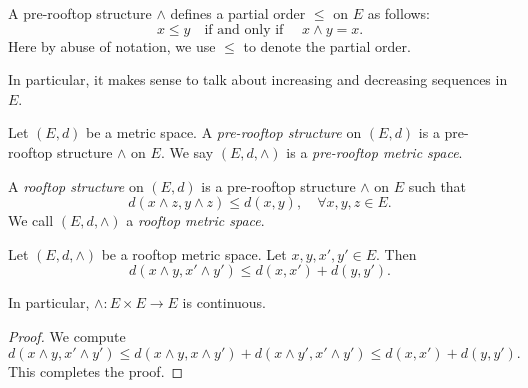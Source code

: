 A pre-rooftop structure $\land$ defines a partial order $\leq$ on $E$ as follows:
\[
x\leq y\quad \text{if and only if } \quad x\land y=x.
\]
Here by abuse of notation, we use $\leq$ to denote the partial order.

In particular, it makes sense to talk about increasing and decreasing sequences in $E$.

\begin{definition}\label{def:roof}
	Let $(E,d)$ be a metric space. A \emph{pre-rooftop structure} on $(E,d)$ is a pre-rooftop structure $\land$ on $E$. We say $(E,d,\land)$ is a \emph{pre-rooftop metric space}.

	A \emph{rooftop structure} on $(E,d)$ is a pre-rooftop structure $\land$ on $E$ such that
	\begin{equation}\label{eq:rtdef}
		d(x\land z,y\land z)\leq d(x,y),\quad \forall x,y,z\in E.
	\end{equation}
	We call $(E,d,\land)$ a \emph{rooftop metric space}.
\end{definition}

\begin{lemma}\label{lma:landdis}
	Let $(E,d,\land)$ be a rooftop metric space. Let $x,y,x',y'\in E$. Then
	\begin{equation}
		d(x\land y,x'\land y')\leq d(x,x')+d(y,y').
	\end{equation}
\end{lemma}
In particular, $\land\colon E\times E\rightarrow E$ is continuous.
\begin{proof}
	We compute
	\[
	d(x\land y,x'\land y')\leq d(x\land y,x\land y')+d(x\land y',x'\land y')\leq d(x,x')+d(y,y').
	\]
	This completes the proof.
\end{proof}


